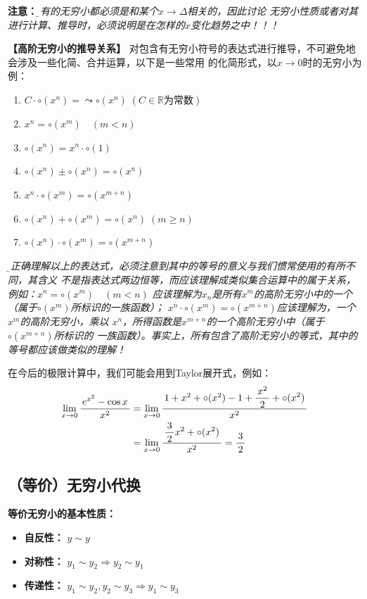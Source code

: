 {\bf 注意：}{\it\b 所有的无穷小都必须是和某个$x\to\Delta$相关的，因此讨论
无穷小性质或者对其进行计算、推导时，必须说明是在怎样的$x$变化趋势之中！！！}

\begin{shaded}
	{\bf 【高阶无穷小的推导关系】}
	对包含有无穷小符号的表达式进行推导，不可避免地会涉及一些化简、合并运算，以下是一些常用
	的化简形式，以$x\to 0$时的无穷小为例：
	\begin{enumerate}[(1)]
  	  \setlength{\itemindent}{1cm}
  	  \item $C\cdot\circ(x^n)=\leadsto\circ(x^n)\;(C\in\mathbb{R}\mbox{为常数})$
	  \item $x^n=\circ(x^m)\quad (m<n)$ 
	  \item $\circ(x^n)=x^n\cdot\circ(1)$
	  \item $\circ(x^n)\pm\circ(x^n)=\circ(x^n)$
	  \item $x^n\cdot\circ(x^m)=\circ(x^{m+n})$ 
	  \item $\circ(x^n)+\circ(x^m)=\circ(x^n)\;(m\geq n)$  
	  \item $\circ(x^n)\cdot\circ(x^m)=\circ(x^{m+n})$
	\end{enumerate}
	
	{\it\b 要正确理解以上的表达式，必须注意到其中的等号的意义与我们惯常使用的有所不同，其含义
	不是指表达式两边恒等，而应该理解成类似集合运算中的属于关系，例如：$x^n=\circ(x^m)\quad (m<n)$ 
	应该理解为$x_n$是所有$x^m$的高阶无穷小中的一个（属于$\circ(x^m)$所标识的一族函数）；
	$x^n\cdot\circ(x^m)=\circ(x^{m+n})$应该理解为，一个$x^m$的高阶无穷小，乘以
	$x^n$，所得函数是$x^{m+n}$的一个高阶无穷小中（属于$\circ(x^{m+n})$所标识的
	一族函数）。事实上，所有包含了高阶无穷小的等式，其中的等号都应该做类似的理解！}
	
	在今后的极限计算中，我们可能会用到Taylor展开式，例如：
	\begin{align}
		\lim\limits_{x\to{0}}\displaystyle\frac{\,{e^{x^2}-\cos x}\,}{\,{x^2}\,}&=\lim\limits_{x\to{0}}
		\displaystyle\frac{\,{1+x^2+\circ(x^2)-1+\displaystyle\frac{\,{x^2}\,}{\,{2}\,}+\circ(x^2)}\,}{\,{x^2}\,}\notag\\
		&=\lim\limits_{x\to{0}}\displaystyle\frac{\,{\displaystyle\frac{\,{3}\,}{\,{2}\,}x^2+\circ(x^2)}\,}{\,{x^2}\,}=\displaystyle\frac{\,{3}\,}{\,{2}\,}\notag
	\end{align}
\end{shaded}

\subsection{（等价）无穷小代换}

{\bf 等价无穷小的基本性质：}
\begin{itemize}
  \setlength{\itemindent}{1cm}
  \item {\bf 自反性：} $y\sim y$ 
  \item {\bf 对称性：} $y_1\sim y_2\Rightarrow y_2\sim y_1$ 
  \item {\bf 传递性：} $y_1\sim y_2,y_2\sim y_3\Rightarrow y_1\sim y_3$ 
\end{itemize}

